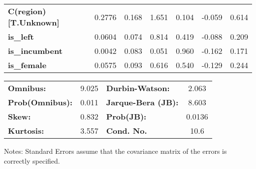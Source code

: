 \begin{center}
\begin{tabular}{lcccccc}
\textbf{C(region)[T.Unknown]}  &       0.2776  &        0.168     &     1.651  &         0.104        &       -0.059    &        0.614     \\
\textbf{is\_left}              &       0.0604  &        0.074     &     0.814  &         0.419        &       -0.088    &        0.209     \\
\textbf{is\_incumbent}         &       0.0042  &        0.083     &     0.051  &         0.960        &       -0.162    &        0.171     \\
\textbf{is\_female}            &       0.0575  &        0.093     &     0.616  &         0.540        &       -0.129    &        0.244     \\
\bottomrule
\end{tabular}
\begin{tabular}{lclc}
\textbf{Omnibus:}       &  9.025 & \textbf{  Durbin-Watson:     } &    2.063  \\
\textbf{Prob(Omnibus):} &  0.011 & \textbf{  Jarque-Bera (JB):  } &    8.603  \\
\textbf{Skew:}          &  0.832 & \textbf{  Prob(JB):          } &   0.0136  \\
\textbf{Kurtosis:}      &  3.557 & \textbf{  Cond. No.          } &     10.6  \\
\bottomrule
\end{tabular}
\end{center}

Notes: \newline
 [1] Standard Errors assume that the covariance matrix of the errors is correctly specified.